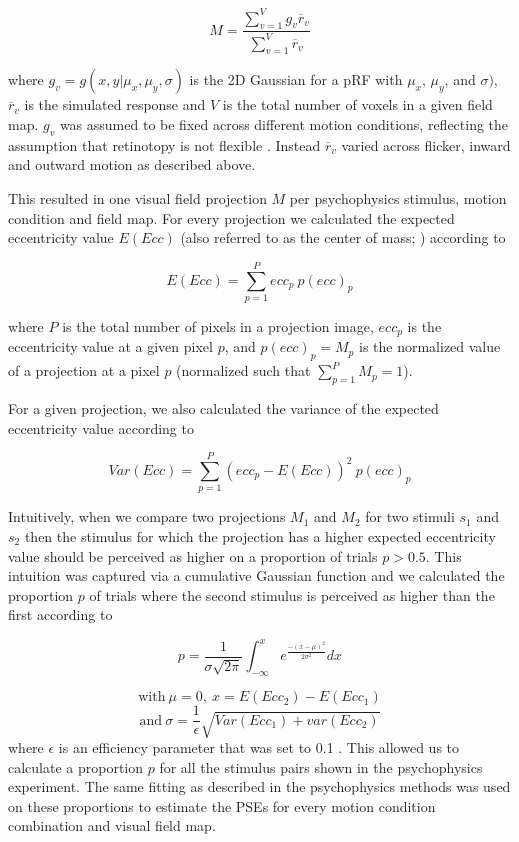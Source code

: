 \begin{equation}
M = \frac{\sum_{v=1}^{V} g_v \overline{r}_v}{\sum_{v=1}^{V} \overline{r}_v}
\end{equation}

where $g_v = g(x, y|\mu_x,\mu_y,\sigma)$ is the 2D Gaussian for a pRF with $\mu_x$, $\mu_y$, and $\sigma)$, $\overline{r}_v$ is the simulated response and $V$ is the total number of voxels in a given field map. $g_v$ was assumed to be fixed across different motion conditions, reflecting the assumption that retinotopy is not flexible \parencite{Liu2006}. Instead $\overline{r}_v$ varied across flicker, inward and outward motion as described above.

This resulted in one visual field projection $M$ per psychophysics stimulus, motion condition and field map. For every projection we calculated the expected eccentricity value $E(Ecc)$ (also referred to as the center of mass; \cite{Liu2006}) according to

\begin{equation}
E(Ecc) = \sum_{p=1}^{P} ecc_p\ p(ecc)_p
\end{equation}

where $P$ is the total number of pixels in a projection image, $ecc_p$ is the eccentricity value at a given pixel $p$, and $p(ecc)_p = M_p$ is the normalized value of a projection at a pixel $p$ (normalized such that $\sum_{p=1}^{P} M_p = 1$).

For a given projection, we also calculated the variance of the expected eccentricity value according to

\begin{equation}
Var(Ecc) = \sum_{p=1}^{P} (ecc_p - E(Ecc))^2\ p(ecc)_p
\end{equation}

Intuitively, when we compare two projections $M_1$ and $M_2$ for two stimuli $s_1$ and $s_2$ then the stimulus for which the projection has a higher expected eccentricity value should be perceived as higher on a proportion of trials $p > 0.5$. This intuition was captured via a cumulative Gaussian function \parencite{VanHumbeeck2016} and we calculated the proportion $p$ of trials where the second stimulus is perceived as higher than the first according to

\begin{equation}
p = \frac{1}{\sigma \sqrt{2 \pi}} \int_{-\infty}^{x} e^{\frac{-(x - \mu)^2}{2 \sigma^2}}dx
\end{equation}

$$\textrm{with}\ \mu = 0,\ x = E(Ecc_2) - E(Ecc_1)$$
$$\textrm{and}\ \sigma = \frac{1}{\epsilon}\sqrt{Var(Ecc_1) + var(Ecc_2)}$$
where $\epsilon$ is an efficiency parameter that was set to 0.1 \parencite{VanHumbeeck2016}. This allowed us to calculate a proportion $p$ for all the stimulus pairs shown in the psychophysics experiment. The same fitting as described in the psychophysics methods was used on these proportions to estimate the PSEs for every motion condition combination and visual field map.

